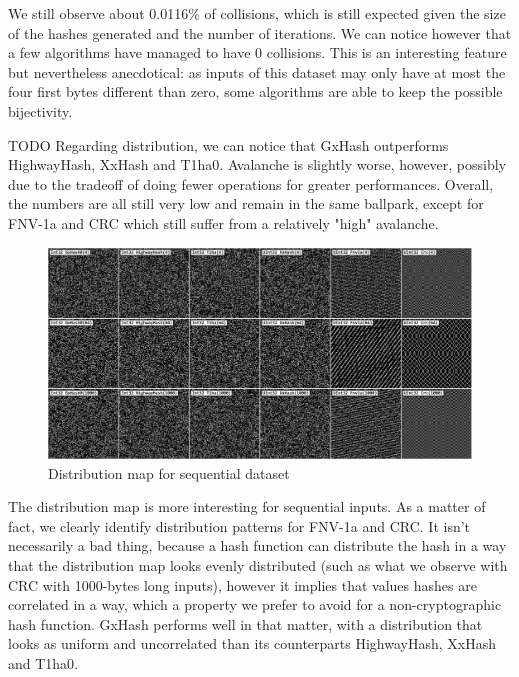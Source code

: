 \documentclass[10pt]{article}
\begin{document}
We still observe about 0.0116\% of collisions, which is still expected given the size of the hashes generated and the number of iterations. We can notice however that a few algorithms have managed to have 0 collisions. This is an interesting feature but nevertheless anecdotical: as inputs of this dataset may only have at most the four first bytes different than zero, some algorithms are able to keep the possible bijectivity.

TODO
Regarding distribution, we can notice that GxHash outperforms HighwayHash\cite{highwayhash}, XxHash\cite{xxhash} and T1ha0\cite{rust-t1ha}. Avalanche is slightly worse, however, possibly due to the tradeoff of doing fewer operations for greater performances. Overall, the numbers are all still very low and remain in the same ballpark, except for FNV-1a and CRC which still suffer from a relatively "high" avalanche.

\begin{figure}[H]
\centering
\includegraphics[width=1\textwidth]{quality-sequential.png}
\caption{Distribution map for sequential dataset}
\label{fig:quality-sequential}
\end{figure}

The distribution map is more interesting for sequential inputs. As a matter of fact, we clearly identify distribution patterns for FNV-1a and CRC. It isn't necessarily a bad thing, because a hash function can distribute the hash in a way that the distribution map looks evenly distributed (such as what we observe with CRC with 1000-bytes long inputs), however it implies that values hashes are correlated in a way, which a property we prefer to avoid for a non-cryptographic hash function. GxHash performs well in that matter, with a distribution that looks as uniform and uncorrelated than its counterparts HighwayHash\cite{highwayhash}, XxHash\cite{xxhash} and T1ha0\cite{rust-t1ha}.
\end{document}
